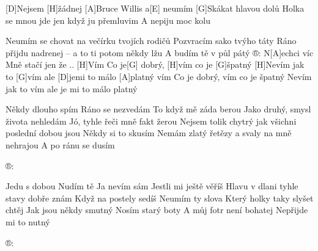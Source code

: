 
[D]Nejsem [H]\null žádnej [A]Bruce Willis a[E] neumím
[G]Skákat hlavou dolů
Holka se mnou jde jen když ju přemluvim
A nepiju moc kolu

Neumím se chovat na večírku tvojích rodičů
Pozvracím sako tvýho táty
Ráno přijdu nadrenej – a to ti potom někdy lžu
A budím tě v půl pátý
®: N[A]echci víc Mně stačí jen že ..
[H]Vím Co je[G] dobrý, [H]vím co je [G]\null špatný
[H]Nevím jak to [G]vím ale [D]jemi to málo [A]platný
vím Co je dobrý, vím co je špatný
Nevím jak to vím ale je mi to málo platný

Někdy dlouho spím
Ráno se nezvedám
To když mě záda berou
Jako druhý, smysl života nehledám
Jó, tyhle řeči mně fakt žerou
Nejsem tolik chytrý jak všichni poslední dobou jsou
Někdy si to skusím
Nemám zlatý řetězy a svaly na mně nehrajou
A po ránu se dusím

®:

Jedu s dobou
Nudím tě
Ja nevím sám
Jestli mi ještě věříš
Hlavu v dlani tyhle stavy dobře znám
Když na postely sedíš
Neumím ty slova
Který holky taky slyšet chtěj
Jak jsou někdy smutný
Nosím starý boty
A můj fotr není bohatej
Nepřijde mi to nutný

®:


